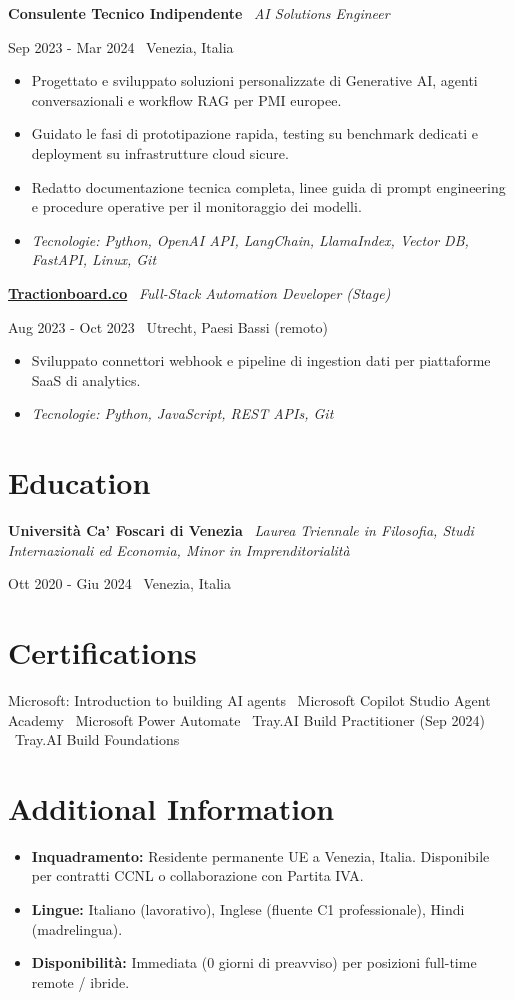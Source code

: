 \documentclass[a4paper,10pt]{article}
\newcommand{\role}[4]{%
  \vspace{2pt}\noindent
  \begin{minipage}[t]{0.70\textwidth}\raggedright\textbf{#1} \textbullet\ \textit{#3}\end{minipage}%
  \hfill
  \begin{minipage}[t]{0.28\textwidth}\raggedleft\footnotesize\color{gray}#2 \textbullet\ #4\end{minipage}%
  \vspace{1pt}%
}
\begin{document}
\role{Consulente Tecnico Indipendente}{Sep 2023 - Mar 2024}{AI Solutions Engineer}{Venezia, Italia}
\begin{itemize}
  \item Progettato e sviluppato soluzioni personalizzate di Generative AI, agenti conversazionali e workflow RAG per PMI europee.
  \item Guidato le fasi di prototipazione rapida, testing su benchmark dedicati e deployment su infrastrutture cloud sicure.
  \item Redatto documentazione tecnica completa, linee guida di prompt engineering e procedure operative per il monitoraggio dei modelli.
  \item \textit{Tecnologie: Python, OpenAI API, LangChain, LlamaIndex, Vector DB, FastAPI, Linux, Git}
\end{itemize}

\role{\href{https://tractionboard.co}{Tractionboard.co}}{Aug 2023 - Oct 2023}{Full-Stack Automation Developer (Stage)}{Utrecht, Paesi Bassi (remoto)}
\begin{itemize}
  \item Sviluppato connettori webhook e pipeline di ingestion dati per piattaforme SaaS di analytics.
  \item \textit{Tecnologie: Python, JavaScript, REST APIs, Git}
\end{itemize}

\section{Education}
\role{Università Ca' Foscari di Venezia}{Ott 2020 - Giu 2024}{Laurea Triennale in Filosofia, Studi Internazionali ed Economia, Minor in Imprenditorialità}{Venezia, Italia}

\section{Certifications}
Microsoft: Introduction to building AI agents \textbullet\ Microsoft Copilot Studio Agent Academy \textbullet\ Microsoft Power Automate \textbullet\ Tray.AI Build Practitioner (Sep 2024) \textbullet\ Tray.AI Build Foundations

\section{Additional Information}
\begin{itemize}
  \item \textbf{Inquadramento:} Residente permanente UE a Venezia, Italia. Disponibile per contratti CCNL o collaborazione con Partita IVA.
  \item \textbf{Lingue:} Italiano (lavorativo), Inglese (fluente C1 professionale), Hindi (madrelingua).
  \item \textbf{Disponibilità:} Immediata (0 giorni di preavviso) per posizioni full-time remote / ibride.
\end{itemize}
\end{document}
